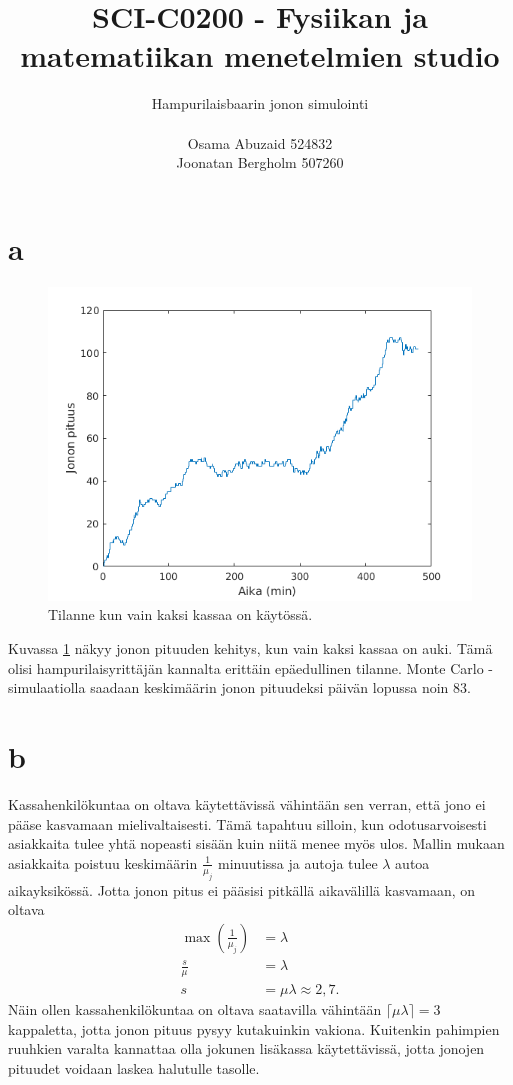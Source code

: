 \documentclass{article}     %
\title{SCI-C0200 - Fysiikan ja matematiikan menetelmien studio}
\author{Hampurilaisbaarin jonon simulointi\\ \\ Osama Abuzaid 524832 \\ Joonatan Bergholm 507260}
\begin{document}
\maketitle
\newpage

\section*{a}

\begin{figure}
\centering
\includegraphics[width = \textwidth]{matlab/a.png}
\caption{Tilanne kun vain kaksi kassaa on käytössä.}
\label{fig:a}
\end{figure}

Kuvassa \ref{fig:a} näkyy jonon pituuden kehitys, kun vain kaksi kassaa on auki. Tämä olisi hampurilaisyrittäjän kannalta erittäin epäedullinen tilanne. Monte Carlo -simulaatiolla saadaan keskimäärin jonon pituudeksi päivän lopussa noin 83.

\section*{b}
Kassahenkilökuntaa on oltava käytettävissä vähintään sen verran, että jono ei pääse kasvamaan mielivaltaisesti. Tämä tapahtuu silloin, kun odotusarvoisesti asiakkaita tulee yhtä nopeasti sisään kuin niitä menee myös ulos. Mallin mukaan asiakkaita poistuu keskimäärin $\frac{1}{\mu_j}$ minuutissa ja autoja tulee $\lambda$ autoa aikayksikössä. Jotta jonon pitus ei pääsisi pitkällä aikavälillä kasvamaan, on oltava
\begin{align}
\max\left(\frac{1}{\mu_j}\right) &= \lambda \nonumber\\
\frac{s}{\mu} &= \lambda \nonumber\\
s &= \mu \lambda \approx 2,7.
\end{align}
Näin ollen kassahenkilökuntaa on oltava saatavilla vähintään $\lceil \mu \lambda \rceil = 3$ kappaletta, jotta jonon pituus pysyy kutakuinkin vakiona. Kuitenkin pahimpien ruuhkien varalta kannattaa olla jokunen lisäkassa käytettävissä, jotta jonojen pituudet voidaan laskea halutulle tasolle.
\end{document}
